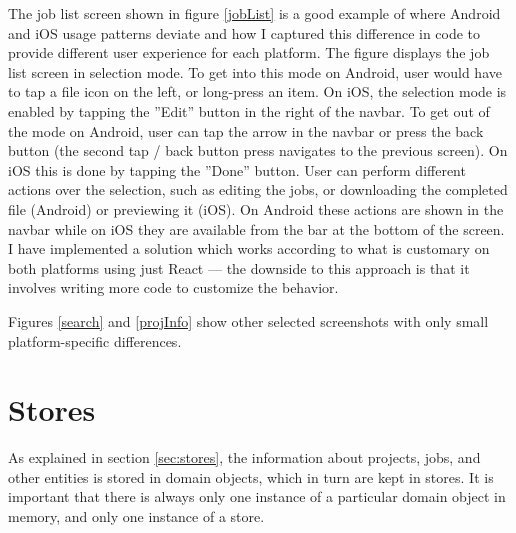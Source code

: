 The job list screen shown in figure \ref{jobList} is a good example of where Android and iOS usage patterns deviate and how I captured this difference in code to provide different user experience for each platform. The figure displays the job list screen in selection mode. To get into this mode on Android, user would have to tap a file icon on the left, or long-press an item. On iOS, the selection mode is enabled by tapping the ''Edit'' button in the right of the navbar. To get out of the mode on Android, user can tap the arrow in the navbar or press the back button (the second tap / back button press navigates to the previous screen). On iOS this is done by tapping the ''Done'' button. User can perform different actions over the selection, such as editing the jobs, or downloading the completed file (Android) or previewing it (iOS). On Android these actions are shown in the navbar while on iOS they are available from the bar at the bottom of the screen. I have implemented a solution which works according to what is customary on both platforms using just React --- the downside to this approach is that it involves writing more code to customize the behavior.

Figures \ref{search} and \ref{projInfo} show other selected screenshots with only small platform-specific differences.


\section{Stores}

As explained in section \ref{sec:stores}, the information about projects, jobs, and other entities is stored in domain objects, which in turn are kept in stores. It is important that there is always only one instance of a particular domain object in memory, and only one instance of a store.

